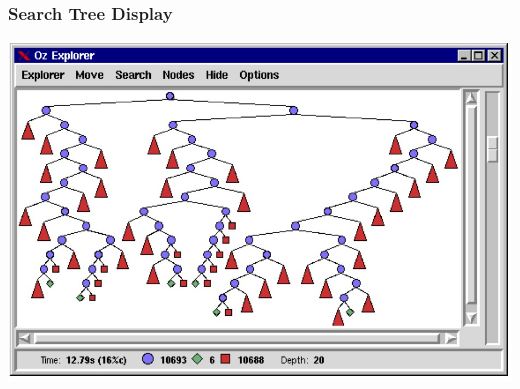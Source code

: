 \begin{frame}
  \frametitle{Search Tree Display \cite{DBLP:conf/iclp/Schulte97}}
  
  \includegraphics[width=.6\textwidth]{images/oz_explorer_1.jpg}
  
\end{frame}


